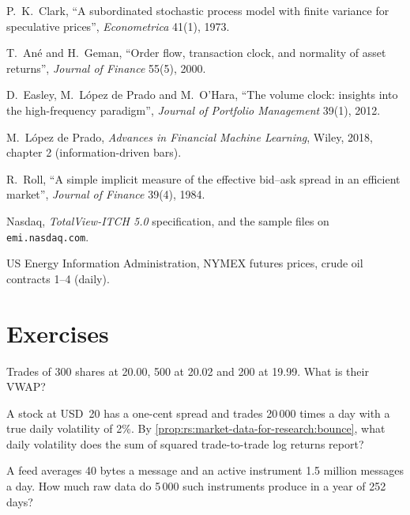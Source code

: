 \begin{omsources}
\item P.~K.~Clark, ``A subordinated stochastic process model with finite variance for speculative prices'',
\emph{Econometrica} 41(1), 1973.
\item T.~Ané and H.~Geman, ``Order flow, transaction clock, and normality of asset returns'', \emph{Journal of Finance} 55(5),
2000.
\item D.~Easley, M.~López de Prado and M.~O'Hara, ``The volume clock: insights into the high-frequency paradigm'',
\emph{Journal of Portfolio Management} 39(1), 2012.
\item M.~López de Prado, \emph{Advances in Financial Machine Learning}, Wiley, 2018, chapter 2 (information-driven bars).
\item R.~Roll, ``A simple implicit measure of the effective bid--ask spread in an efficient market'', \emph{Journal of Finance}
39(4), 1984.
\item Nasdaq, \emph{TotalView-ITCH 5.0} specification, and the sample files on \texttt{emi.nasdaq.com}.
\item US Energy Information Administration, NYMEX futures prices, crude oil contracts 1--4 (daily).
\end{omsources}

\section{Exercises}

\begin{exercise}[$\star$]\label{exo:rs:market-data-for-research:1}
Trades of 300 shares at 20.00, 500 at 20.02 and 200 at 19.99. What is their VWAP?
\end{exercise}

\begin{exercise}[$\star$]\label{exo:rs:market-data-for-research:2}
A stock at USD~20 has a one-cent spread and trades 20\,000 times a day with a true daily volatility of 2\%. By
\cref{prop:rs:market-data-for-research:bounce}, what daily volatility does the sum of squared trade-to-trade log returns report?
\end{exercise}

\begin{exercise}[$\star$]\label{exo:rs:market-data-for-research:3}
A feed averages 40 bytes a message and an active instrument 1.5 million messages a day. How much raw data do 5\,000 such
instruments produce in a year of 252 days?
\end{exercise}

